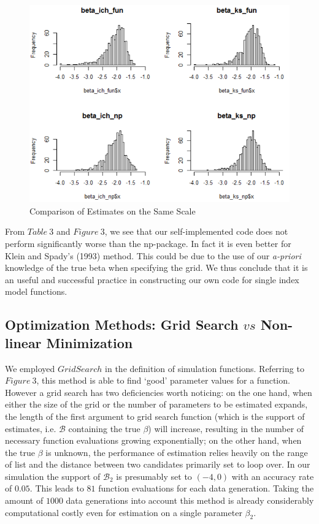 \documentclass[a4paper]{article}
\begin{document}
\begin{figure}[h!]
  \caption{Comparison of Estimates on the Same Scale}
  \includegraphics[width=\linewidth]{compare_done.png}
 
  \label{fig:comparison of estimates on the same scale}
\end{figure}

From $Table\ 3$ and $Figure\ 3$, we see that our self-implemented code does not perform significantly worse than the np-package. In fact it is even better for Klein and Spady's (1993) \cite{[12]} method. This could be due to the use of our \textit{a-priori} knowledge of the true beta when specifying the grid. We thus conclude that it is an useful and successful practice in constructing our own code for single index model functions.

\subsection{Optimization Methods: Grid Search $vs$ Non-linear Minimization}
\label{A comparison in optimization methods:grid search and non-linear squares}
We employed $Grid Search$ in the definition of simulation functions. Referring to $Figure\ 3$, this method is able to find `good' parameter values for a function. However a grid search has two deficiencies worth noticing: on the one hand, when either the size of the grid or the number of parameters to be estimated expands, the length of the first argument to grid search function (which is the support of estimates, i.e. $\mathcal{B}$ containing the true $\beta$) will increase, resulting in the number of necessary function evaluations growing exponentially; on the other hand, when the true $\beta$ is unknown, the performance of estimation relies heavily on the range of list and the distance between two candidates primarily set to loop over. In our simulation the support of $\mathcal{B}_2$ is presumably set to $(-4,0)$ with an accuracy rate of $0.05$. This leads to $81$ function evaluations for each data generation. Taking the amount of $1000$ data generations into account this method is already considerably computational costly even for estimation on a single parameter $\beta_2$. 
\end{document}
